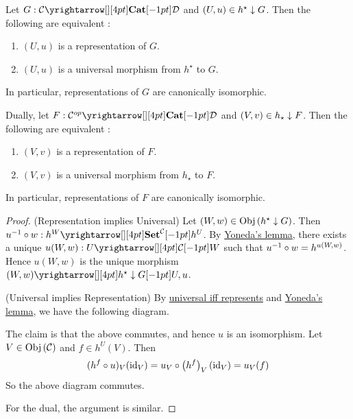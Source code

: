 \begin{prop}
  
  Let $G : \map{\CC}{\DD}{\CAT}{}$ and $(U,u) \in h^\star\downarrow G$.
  Then the following are equivalent : 
  \begin{enumerate}
    \item $(U,u)$ is a representation of $G$.
    \item $(U,u)$ is a universal morphism from $h^\star$ to $G$.
  \end{enumerate}
  In particular, 
  representations of $G$ are canonically isomorphic. 

  Dually, let $F : \map{\CC\op}{\DD}{\CAT}{}$ and $(V,v) \in h_\star\downarrow F$.
  Then the following are equivalent : 
  \begin{enumerate}
    \item $(V,v)$ is a representation of $F$.
    \item $(V,v)$ is a universal morphism from $h_\star$ to $F$.
  \end{enumerate}
  In particular, 
  representations of $F$ are canonically isomorphic. 
\end{prop}
\begin{proof}
  (Representation implies Universal)
  Let $(W,w) \in \mathrm{Obj}\left(h^\star\downarrow G\right)$.
  Then $u\inv \circ w : \map{h^W}{h^U}{\SET^\CC}{}$.
  By \hyperlink{yoneda}{Yoneda's lemma},
  there exists a unique $u(W,w) : \map{U}{W}{\CC}{}$ such that 
  $u^{-1} \circ w = h^{u(W,w)}$.
  Hence $u(W,w)$ is the unique morphism 
  $\map{(W,w)}{U,u}{h^\star\darrow G}{}$.

  (Universal implies Representation)
  By \hyperlink{uni_iff_rep}{universal iff represents}
  and \hyperlink{yoneda}{Yoneda's lemma},
  we have the following diagram. 
  \begin{figure}[H]
    \centering
  \end{figure}
  The claim is that the above commutes, and hence $u$ is an isomorphism.
  Let $V \in \mathrm{Obj}\left(\mathcal{C}\right)$ and $f \in h^U(V)$.
  Then \begin{align*}
    (h^f \circ u)_V(\mathrm{id}_{V})
    = u_V \circ \left(h^f\right)_V \left(\mathrm{id}_{V}\right)
    = u_V (f)
  \end{align*}
  So the above diagram commutes. 

  For the dual, the argument is similar. 
\end{proof}